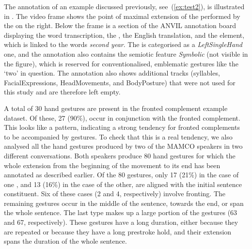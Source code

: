 \documentclass[output=paper]{LSP/langsci}
\begin{document}
The  annotation of an example discussed previously,
see~(\ref{ex:test2}), is illustrated in . The
video frame shows the point of maximal extension of the 
performed by the  on the right.
Below the frame is a section of
the ANVIL annotation board displaying the word transcription, the
, the English translation, and the 
element, which is linked to the words {\em second year}. The 
is categorised as a {\em LeftSingleHand} one, and the annotation also
contains the semiotic feature {\em Symbolic} (not visible in the
figure), which is reserved for conventionalised, emblematic gestures
like the `two'  in question. The annotation also shows
additional tracks (syllables, FacialExpressions, HeadMovements, and
BodyPosture) that were not used for this study and are therefore left
empty.

A total of 30 hand gestures are present in the fronted complement
example dataset. Of these, 27 (90\%), occur in conjunction with the
fronted complement.
This looks like a pattern, indicating a strong tendency for fronted
complements to be accompanied by gestures. To check that this is a real
tendency, we also analysed all the hand gestures produced by two of
the MAMCO speakers in two different conversations. Both speakers
produce 80 hand gestures for which the whole extension from the
beginning of the movement to its end has been annotated as described
earlier. Of the 80 gestures, only 17 (21\%) in the case of one
, and 13 (16\%) in the case of the other, are aligned with the
initial sentence constituent. Six of these cases (2 and 4,
respectively) involve fronting. The remaining gestures occur in the
middle of the sentence, towards the end, or span the whole
sentence. The last type makes up a large portion of the gestures (63
and 67, respectively). These gestures have a long duration, either
because they are repeated or because they have a long prestroke hold,
and their extension spans the duration of the whole sentence.
\end{document}
